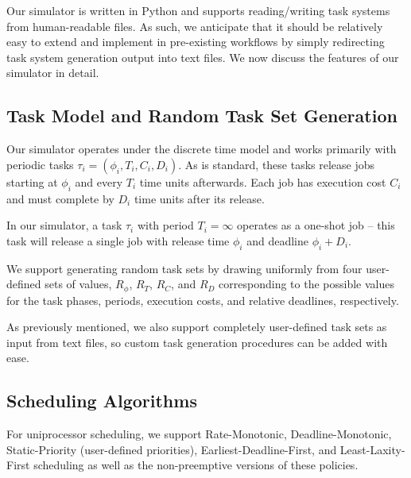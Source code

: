 \documentclass[11pt]{article}
\begin{document}
Our simulator is written in Python and supports reading/writing task systems from human-readable files. As such, we anticipate that it should be relatively easy to extend and implement in pre-existing workflows by simply redirecting task system generation output into text files. We now discuss the features of our simulator in detail. 

\subsection{Task Model and Random Task Set Generation}

Our simulator operates under the discrete time model and works primarily with periodic tasks $\tau_i = (\phi_i, T_i, C_i, D_i)$. As is standard, these tasks release jobs starting at $\phi_i$ and every $T_i$ time units afterwards. Each job has execution cost $C_i$ and must complete by $D_i$ time units after its release.

In our simulator, a task $\tau_i$ with period $T_i = \infty$ operates as a one-shot job -- this task will release a single job with release time $\phi_i$ and deadline $\phi_i + D_i$.

We support generating random task sets by drawing uniformly from four user-defined sets of values, $R_\phi$, $R_T$, $R_C$, and $R_D$ corresponding to the possible values for the task phases, periods, execution costs, and relative deadlines, respectively.

As previously mentioned, we also support completely user-defined task sets as input from text files, so custom task generation procedures can be added with ease.

\subsection{Scheduling Algorithms}

For uniprocessor scheduling, we support Rate-Monotonic, Deadline-Monotonic, Static-Priority (user-defined priorities), Earliest-Deadline-First, and Least-Laxity-First scheduling as well as the non-preemptive versions of these policies.
\end{document}
